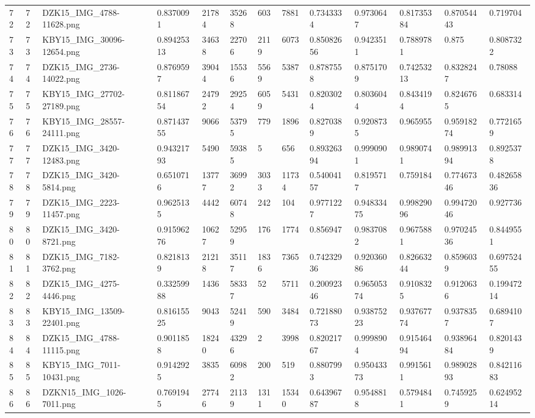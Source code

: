 \documentclass[11pt, a4paper, twoside]{report}
\begin{document}
\begin{longtable}[c]{@{}lllllllllllll@{}}
72 & 72 & DZK15\_IMG\_4788-11628.png & 0.8370091 & 21784 & 35268 & 603 & 7881 & 0.7343334 & 0.9730647 & 0.81735384 & 0.87054443 & 0.719704 \\
73 & 73 & KBY15\_IMG\_30096-12654.png & 0.89425313 & 34638 & 22706 & 2119 & 6073 & 0.85082656 & 0.9423511 & 0.7889781 & 0.875 & 0.8087322 \\
74 & 74 & DZK15\_IMG\_2736-14022.png & 0.8769597 & 39044 & 15536 & 5569 & 5387 & 0.8787558 & 0.8751709 & 0.74253213 & 0.8328247 & 0.78088 \\
75 & 75 & KBY15\_IMG\_27702-27189.png & 0.81186754 & 24792 & 29254 & 6059 & 5431 & 0.8203024 & 0.8036044 & 0.8434194 & 0.8246765 & 0.683314 \\
76 & 76 & KBY15\_IMG\_28557-24111.png & 0.87143755 & 9066 & 53795 & 779 & 1896 & 0.8270389 & 0.9208735 & 0.965955 & 0.95918274 & 0.7721659 \\
77 & 77 & DZK15\_IMG\_3420-12483.png & 0.94321793 & 5490 & 59385 & 5 & 656 & 0.89326394 & 0.9990901 & 0.9890741 & 0.98991394 & 0.8925378 \\
78 & 78 & DZK15\_IMG\_3420-5814.png & 0.6510716 & 13777 & 36992 & 3033 & 11734 & 0.54004157 & 0.8195717 & 0.759184 & 0.77467346 & 0.48265836 \\
79 & 79 & DZK15\_IMG\_2223-11457.png & 0.9625135 & 4442 & 60748 & 242 & 104 & 0.9771227 & 0.94833475 & 0.99829096 & 0.99472046 & 0.927736 \\
80 & 80 & DZK15\_IMG\_3420-8721.png & 0.91596276 & 10627 & 52959 & 176 & 1774 & 0.856947 & 0.9837082 & 0.9675881 & 0.97024536 & 0.8449551 \\
81 & 81 & DZK15\_IMG\_7182-3762.png & 0.8218139 & 21218 & 35117 & 1836 & 7365 & 0.74232936 & 0.92036086 & 0.82663244 & 0.8596039 & 0.69752455 \\
82 & 82 & DZK15\_IMG\_4275-4446.png & 0.33259988 & 1436 & 58337 & 52 & 5711 & 0.20092346 & 0.96505374 & 0.9108325 & 0.9120636 & 0.19947214 \\
83 & 83 & KBY15\_IMG\_13509-22401.png & 0.81615525 & 9043 & 52419 & 590 & 3484 & 0.72188073 & 0.93875223 & 0.93767774 & 0.9378357 & 0.6894107 \\
84 & 84 & DZK15\_IMG\_4788-11115.png & 0.9011858 & 18240 & 43296 & 2 & 3998 & 0.82021767 & 0.9998904 & 0.91546494 & 0.93896484 & 0.8201439 \\
85 & 85 & KBY15\_IMG\_7011-10431.png & 0.9142925 & 3835 & 60982 & 200 & 519 & 0.8807993 & 0.95043373 & 0.9915611 & 0.98902893 & 0.84211683 \\
86 & 86 & DZKN15\_IMG\_1026-7011.png & 0.7691945 & 27746 & 21139 & 1311 & 15340 & 0.64396787 & 0.9548818 & 0.5794841 & 0.7459259 & 0.62495214 \\

\end{longtable}
\end{document}
